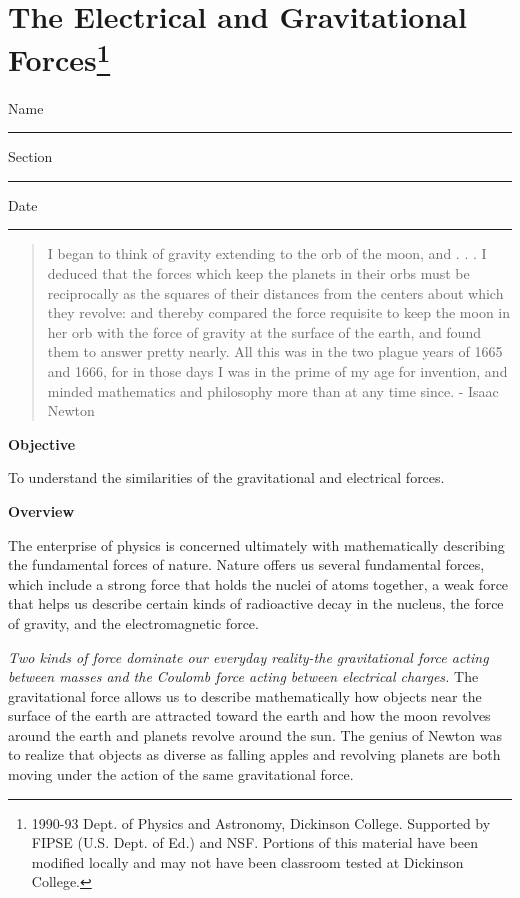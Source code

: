 
\section{The Electrical and Gravitational Forces\footnote{
1990-93 Dept. of Physics and Astronomy, Dickinson College. Supported by FIPSE
(U.S. Dept. of Ed.) and NSF. Portions of this material have been modified locally
and may not have been classroom tested at Dickinson College.
} }

Name \rule{2.0in}{0.1pt}\hfill{}Section \rule{1.0in}{0.1pt}\hfill{}Date \rule{1.0in}{0.1pt}

\begin{quote}
I began to think of gravity extending to the orb of the moon, and . . . I deduced
that the forces which keep the planets in their orbs must be reciprocally as
the squares of their distances from the centers about which they revolve: and
thereby compared the force requisite to keep the moon in her orb with the force
of gravity at the surface of the earth, and found them to answer pretty nearly.
All this was in the two plague years of 1665 and 1666, for in those days I was
in the prime of my age for invention, and minded mathematics and philosophy
more than at any time since. - Isaac Newton 
\end{quote}
\textbf{Objective }

To understand the similarities of the gravitational and electrical forces. 

\textbf{Overview }

The enterprise of physics is concerned ultimately with mathematically describing
the fundamental forces of nature. Nature offers us several fundamental forces,
which include a strong force that holds the nuclei of atoms together, a weak
force that helps us describe certain kinds of radioactive decay in the nucleus,
the force of gravity, and the electromagnetic force. 

\textit{Two kinds of force dominate our everyday reality-the gravitational force
acting between masses and the Coulomb force acting between electrical charges.}
The gravitational force allows us to describe mathematically how objects near
the surface of the earth are attracted toward the earth and how the moon revolves
around the earth and planets revolve around the sun. The genius of Newton was
to realize that objects as diverse as falling apples and revolving planets are
both moving under the action of the same gravitational force. 

